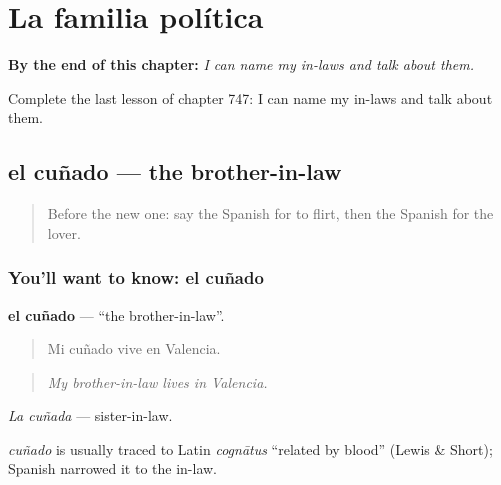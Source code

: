 
\chapter{La familia política}
\label{ch:es-la-familia-politica}

\begin{chapteropening}
\textbf{By the end of this chapter:} \emph{I can name my in-laws and talk about them.}

Complete the last lesson of chapter 747: I can name my in-laws and talk about them.
\end{chapteropening}

\section[el cuñado]{el cuñado — the brother-in-law}

\label{lesson:ES-C747-cunado}



\begin{quote}
Before the new one: say the Spanish for to flirt, then the Spanish for the lover.
\end{quote}

\subsection*{You'll want to know: el cuñado}
\textbf{el cuñado} — \textquotedblleft{}the brother-in-law\textquotedblright{}.

\begin{quote}
Mi cuñado vive en Valencia.
\end{quote}

\begin{quote}
\emph{My brother-in-law lives in Valencia.}
\end{quote}

\emph{La cuñada} — sister-in-law.

\begin{cousinweb}
\emph{cuñado} is usually traced to Latin \emph{cognātus} \textquotedblleft{}related by blood\textquotedblright{} (Lewis \& Short); Spanish narrowed it to the in-law.
\end{cousinweb}

